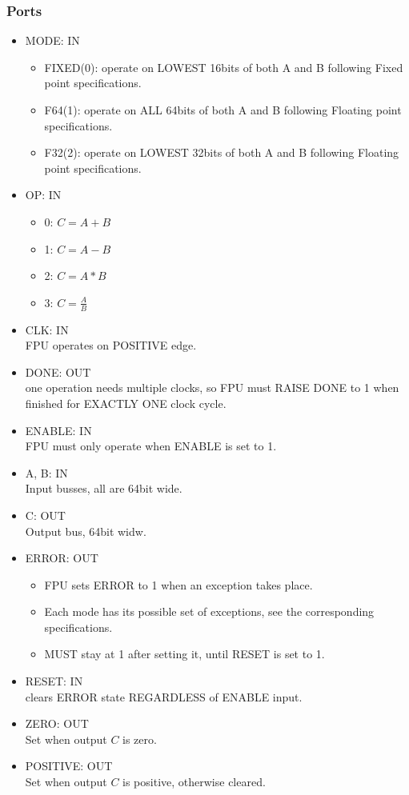 \documentclass[12pt]{report}
\begin{document}
\subsubsection{Ports}
\begin{itemize}
    \item MODE: IN
    \begin{itemize}
        \item FIXED(0): operate on LOWEST 16bits of both A and B following Fixed point specifications.
        \item F64(1): operate on ALL 64bits of both A and B following Floating point specifications.
        \item F32(2): operate on LOWEST 32bits of both A and B following Floating point specifications.
    \end{itemize}
    \item OP: IN
    \begin{itemize}
        \item 0: $C = A + B$ 
        \item 1: $C = A - B$ 
        \item 2: $C = A * B$ 
        \item 3: $C = \frac{A}{B}$  
    \end{itemize}
    \item CLK: IN\\
        FPU operates on POSITIVE edge.
    \item DONE: OUT\\ 
    one operation needs multiple clocks, so FPU must RAISE DONE to 1 when finished for EXACTLY ONE clock cycle.
    \item ENABLE: IN\\
    FPU must only operate when ENABLE is set to 1.
    \item A, B: IN\\
    Input busses, all are 64bit wide.
    \item C: OUT\\
    Output bus, 64bit widw.
    \item ERROR: OUT
    \begin{itemize}
        \item FPU sets ERROR to 1 when an exception takes place. 
        \item Each mode has its possible set of exceptions, see the corresponding specifications. 
        \item MUST stay at 1 after setting it, until RESET is set to 1.
    \end{itemize}
    \item RESET: IN\\
    clears ERROR state REGARDLESS of ENABLE input.
    \item ZERO: OUT\\
    Set when output $C$ is zero.
    \item POSITIVE: OUT\\
    Set when output $C$ is positive, otherwise cleared.
\end{itemize}
\end{document}
